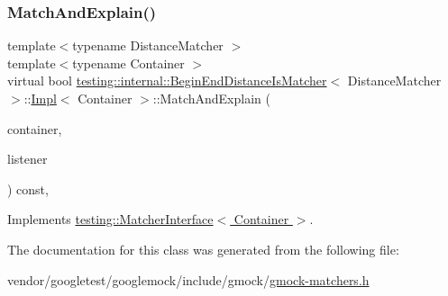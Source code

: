 \subsubsection{\texorpdfstring{Match\+And\+Explain()}{MatchAndExplain()}}
{\footnotesize\ttfamily template$<$typename Distance\+Matcher $>$ \\
template$<$typename Container $>$ \\
virtual bool \hyperlink{classtesting_1_1internal_1_1_begin_end_distance_is_matcher}{testing\+::internal\+::\+Begin\+End\+Distance\+Is\+Matcher}$<$ Distance\+Matcher $>$\+::\hyperlink{classtesting_1_1internal_1_1_begin_end_distance_is_matcher_1_1_impl}{Impl}$<$ Container $>$\+::Match\+And\+Explain (\begin{DoxyParamCaption}\item[{Container}]{container,  }\item[{\hyperlink{classtesting_1_1_match_result_listener}{Match\+Result\+Listener} $\ast$}]{listener }\end{DoxyParamCaption}) const\hspace{0.3cm}{\ttfamily [inline]}, {\ttfamily [virtual]}}



Implements \hyperlink{classtesting_1_1_matcher_interface_a296b43607cd99d60365f0e6a762777cf}{testing\+::\+Matcher\+Interface$<$ Container $>$}.



The documentation for this class was generated from the following file\+:\begin{DoxyCompactItemize}
\item 
vendor/googletest/googlemock/include/gmock/\hyperlink{gmock-matchers_8h}{gmock-\/matchers.\+h}\end{DoxyCompactItemize}
